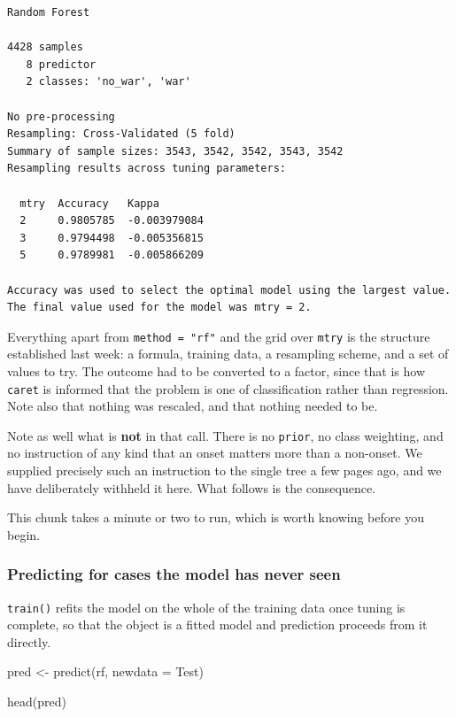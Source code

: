 \documentclass[
  a4paper,
]{scrbook}
\newenvironment{Shaded}{\begin{snugshade}}{\end{snugshade}}
\newcommand{\AttributeTok}[1]{\textcolor[rgb]{0.40,0.45,0.13}{#1}}
\newcommand{\FunctionTok}[1]{\textcolor[rgb]{0.28,0.35,0.67}{#1}}
\newcommand{\NormalTok}[1]{\textcolor[rgb]{0.00,0.23,0.31}{#1}}
\newcommand{\OtherTok}[1]{\textcolor[rgb]{0.00,0.23,0.31}{#1}}
\begin{document}
\begin{verbatim}
Random Forest 

4428 samples
   8 predictor
   2 classes: 'no_war', 'war' 

No pre-processing
Resampling: Cross-Validated (5 fold) 
Summary of sample sizes: 3543, 3542, 3542, 3543, 3542 
Resampling results across tuning parameters:

  mtry  Accuracy   Kappa       
  2     0.9805785  -0.003979084
  3     0.9794498  -0.005356815
  5     0.9789981  -0.005866209

Accuracy was used to select the optimal model using the largest value.
The final value used for the model was mtry = 2.
\end{verbatim}

Everything apart from \texttt{method\ =\ "rf"} and the grid over
\texttt{mtry} is the structure established last week: a formula,
training data, a resampling scheme, and a set of values to try. The
outcome had to be converted to a factor, since that is how
\texttt{caret} is informed that the problem is one of classification
rather than regression. Note also that nothing was rescaled, and that
nothing needed to be.

Note as well what is \textbf{not} in that call. There is no
\texttt{prior}, no class weighting, and no instruction of any kind that
an onset matters more than a non-onset. We supplied precisely such an
instruction to the single tree a few pages ago, and we have deliberately
withheld it here. What follows is the consequence.

This chunk takes a minute or two to run, which is worth knowing before
you begin.

\subsubsection{Predicting for cases the model has never
seen}\label{predicting-for-cases-the-model-has-never-seen}

\texttt{train()} refits the model on the whole of the training data once
tuning is complete, so that the object is a fitted model and prediction
proceeds from it directly.

\begin{Shaded}
\begin{Highlighting}[]
\NormalTok{pred }\OtherTok{\textless{}{-}} \FunctionTok{predict}\NormalTok{(rf, }\AttributeTok{newdata =}\NormalTok{ Test)}

\FunctionTok{head}\NormalTok{(pred)}
\end{Highlighting}
\end{Shaded}
\end{document}
